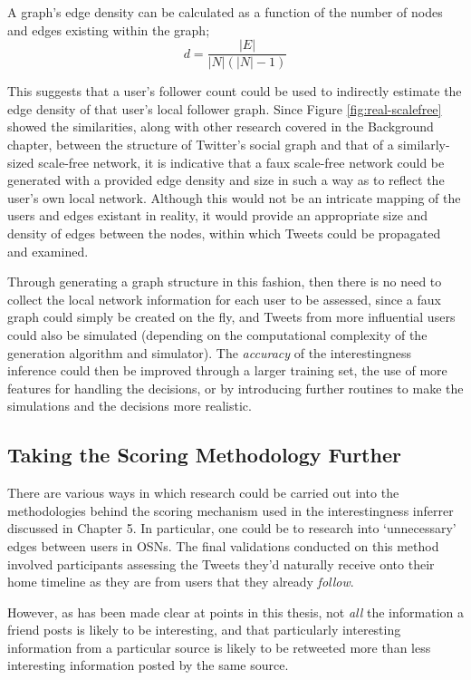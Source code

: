 A graph's edge density can be calculated as a function of the number of nodes and edges existing within the graph;
\[
    d = \frac{|E|}{|N|(|N| - 1)}
\]

This suggests that a user's follower count could be used to indirectly estimate the edge density of that user's local follower graph. Since Figure \ref{fig:real-scalefree} showed the similarities, along with other research covered in the Background chapter, between the structure of Twitter's social graph and that of a similarly-sized scale-free network, it is indicative that a faux scale-free network could be generated with a provided edge density and size in such a way as to reflect the user's own local network. Although this would not be an intricate mapping of the users and edges existant in reality, it would provide an appropriate size and density of edges between the nodes, within which Tweets could be propagated and examined.

Through generating a graph structure in this fashion, then there is no need to collect the local network information for each user to be assessed, since a faux graph could simply be created on the fly, and Tweets from more influential users could also be simulated (depending on the computational complexity of the generation algorithm and simulator). The \textit{accuracy} of the interestingness inference could then be improved through a larger training set, the use of more features for handling the decisions, or by introducing further routines to make the simulations and the decisions more realistic. 


\subsection{Taking the Scoring Methodology Further}
There are various ways in which research could be carried out into the methodologies behind the scoring mechanism used in the interestingness inferrer discussed in Chapter 5. In particular, one could be to research into `unnecessary' edges between users in OSNs. The final validations conducted on this method involved participants assessing the Tweets they'd naturally receive onto their home timeline as they are from users that they already \textit{follow}. 

However, as has been made clear at points in this thesis, not \textit{all} the information a friend posts is likely to be interesting, and that particularly interesting information from a particular source is likely to be retweeted more than less interesting information posted by the same source. 

